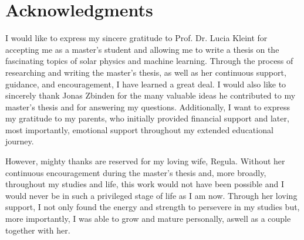 \documentclass[a4paper,12pt]{report}
\begin{document}

\chapter*{Acknowledgments}
I would like to express my sincere gratitude to Prof. Dr. Lucia Kleint for accepting me as a master's student and allowing me to write a thesis on the fascinating topics of solar physics and machine learning. Through the process of researching and writing the master's thesis, as well as her continuous support, guidance, and encouragement, I have learned a great deal. I would also like to sincerely thank Jonas Zbinden for the many valuable ideas he contributed to my master's thesis and for answering my questions. Additionally, I want to express my gratitude to my parents, who initially provided financial support and later, most importantly, emotional support throughout my extended educational journey.

However, mighty thanks are reserved for my loving wife, Regula. Without her continuous encouragement during the master's thesis and, more broadly, throughout my studies and life, this work would not have been possible and I would never be in such a privileged stage of life as I am now. Through her loving support, I not only found the energy and strength to persevere in my studies but, more importantly, I was able to grow and mature personally, aswell as a couple together with her.



\end{document}
